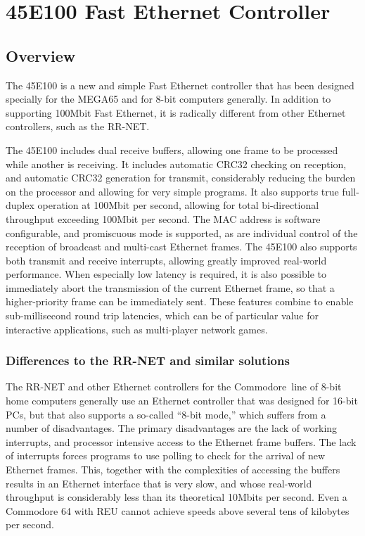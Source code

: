 \chapter{45E100 Fast Ethernet Controller}

\section{Overview}

The 45E100 is a new and simple Fast Ethernet controller that has been
designed specially for the MEGA65 and for 8-bit computers generally.
In addition to supporting 100Mbit Fast Ethernet, it is radically
different from other Ethernet controllers, such as the RR-NET.

The 45E100 includes dual receive buffers, allowing one frame to be
processed while another is receiving.  It includes automatic CRC32
checking on reception, and automatic CRC32 generation for transmit, considerably
reducing the burden on the processor and allowing for very simple programs.  It also supports true
full-duplex operation at 100Mbit per second, allowing for total bi-directional
throughput exceeding 100Mbit per second.  The MAC address is software
configurable, and promiscuous mode is supported, as are individual control
of the reception of broadcast and multi-cast Ethernet frames.  The 45E100 also
supports both transmit and receive interrupts, allowing greatly improved
real-world performance. When especially low latency is required, it is also possible
to immediately abort the transmission of the current Ethernet frame, so that a
higher-priority frame can be immediately sent.
These features combine to enable sub-millisecond round trip latencies,
which can be of particular value for interactive applications, such as multi-player network
games.

\subsection{Differences to the RR-NET and similar solutions}

The RR-NET and other Ethernet controllers for the Commodore\texttrademark \ line
of 8-bit home computers generally use an Ethernet controller that was
designed for 16-bit PCs, but that also supports a so-called ``8-bit mode,''
which suffers from a number of disadvantages. The primary disadvantages
are the lack of working interrupts, and processor intensive access to
the Ethernet frame buffers.  The lack of interrupts forces programs to
use polling to check for the arrival of new Ethernet frames.  This,
together with the complexities of accessing the buffers results in an
Ethernet interface that is very slow, and whose real-world throughput
is considerably less than its theoretical 10Mbits per second.  Even
a Commodore 64 with REU cannot achieve speeds above several tens of
kilobytes per second.

